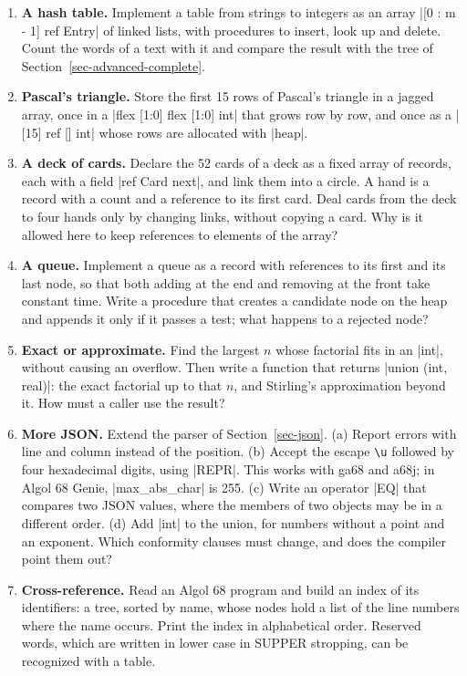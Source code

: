 \begin{enumerate}
  \code|union (int, void)|. Use it in a program that reads names and
  reports each one's number or that it is unknown, with an \code|out|
  branch in every conformity clause.
\item \textbf{A hash table.} Implement a table from strings to integers
  as an array \code|[0 : m - 1] ref Entry| of linked lists, with
  procedures to insert, look up and delete. Count the words of a text
  with it and compare the result with the tree of
  Section~\ref{sec-advanced-complete}.
\item \textbf{Pascal's triangle.} Store the first 15 rows of Pascal's
  triangle in a jagged array, once in a \code|flex [1:0] flex [1:0] int|
  that grows row by row, and once as a \code|[15] ref [] int| whose rows
  are allocated with \code|heap|.
\item \textbf{A deck of cards.} Declare the 52 cards of a deck as a
  fixed array of records, each with a field \code|ref Card next|, and
  link them into a circle. A hand is a record with a count and a
  reference to its first card. Deal cards from the deck to four hands
  only by changing links, without copying a card. Why is it allowed here
  to keep references to elements of the array?
\item \textbf{A queue.} Implement a queue as a record with references
  to its first and its last node, so that both adding at the end and
  removing at the front take constant time. Write a procedure that
  creates a candidate node on the heap and appends it only if it passes a
  test; what happens to a rejected node?
\item \textbf{Exact or approximate.} Find the largest $n$ whose
  factorial fits in an \code|int|, without causing an overflow. Then
  write a function that returns \code|union (int, real)|: the exact
  factorial up to that $n$, and Stirling's approximation beyond it. How
  must a caller use the result?
\item \textbf{More JSON.} Extend the parser of
  Section~\ref{sec-json}. (a) Report errors with line and column instead
  of the position. (b) Accept the escape \texttt{\textbackslash u}
  followed by four hexadecimal digits, using \code|REPR|. This works
  with ga68 and a68j; in Algol 68 Genie, \code|max_abs_char| is 255.
  (c) Write an operator \code|EQ| that compares two JSON values, where the
  members of two objects may be in a different order. (d) Add \code|int|
  to the union, for numbers without a point and an exponent. Which
  conformity clauses must change, and does the compiler point them out?
\item \textbf{Cross-reference.} Read an Algol 68 program and build an
  index of its identifiers: a tree, sorted by name, whose nodes hold a
  list of the line numbers where the name occurs. Print the index in
  alphabetical order.
  Reserved words, which are written in lower case in SUPPER stropping,
  can be recognized with a table.
\end{enumerate}
